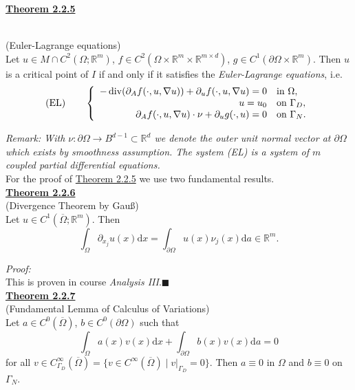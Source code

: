 \hypertarget{theorem_2_2_5}{\textbf{\underline{Theorem 2.2.5}}}\\
(Euler-Lagrange equations)\\
Let $u\in M\cap C^2(\Omega;\mathbb{R}^m)$, $f\in C^2(\Omega\times\mathbb{R}^m\times\mathbb{R}^{m\times d})$, $g\in C^1(\partial\Omega\times\mathbb{R}^m)$. Then $u$ is a critical point of $I$ if and only if it satisfies the \textit{Euler-Lagrange equations}, i.e.
\[\text{(EL)}\qquad\left\{\begin{array}{rl}
	-\operatorname{div}\mathopen{}\left(\partial_Af(\cdot,u,\nabla u)\right)\mathclose{}+\partial_uf(\cdot,u,\nabla u)=0&\text{in }\Omega,\\
	u=u_0&\text{on }\Gamma_D,\\
	\partial_Af(\cdot,u,\nabla u)\cdot\nu+\partial_ug(\cdot,u)=0&\text{on }\Gamma_N.
\end{array}\right.\]

\textit{Remark: With $\nu:\partial\Omega\longrightarrow B^{d-1}\subset\mathbb{R}^d$ we denote the outer unit normal vector at $\partial\Omega$ which exists by smoothness assumption. The system (EL) is a system of $m$ coupled partial differential equations.}\\

For the proof of \hyperlink{theorem_2_2_5}{Theorem 2.2.5} we use two fundamental results.\\

\hypertarget{theorem_2_2_6}{\textbf{\underline{Theorem 2.2.6}}}\\
(Divergence Theorem by Gau{\ss})\\
Let $u\in C^1(\overline{\Omega};\mathbb{R}^m)$. Then
\[\int_\Omega{\partial_{x_j}u(x)\mathrm{d}x}=\int_{\partial \Omega}{u(x)\nu_j(x)\mathrm{d}a}\in\mathbb{R}^m.\]

\textit{Proof:}\\
This is proven in course \textit{Analysis III}.\hfill$\blacksquare$\\[11pt]

\hypertarget{theorem_2_2_7}{\textbf{\underline{Theorem 2.2.7}}}\\
(Fundamental Lemma of Calculus of Variations)\\
Let $a\in C^0(\overline{\Omega})$, $b\in C^0(\partial\Omega)$ such that
\[\int_\Omega{a(x)v(x)\mathrm{d}x}+\int_{\partial\Omega}{b(x)v(x)\mathrm{d}a}=0\]
for all $v\in C_{\Gamma_D}^\infty(\overline{\Omega})=\{v\in C^\infty(\overline{\Omega})\mid v|_{\Gamma_D}=0\}$. Then $a\equiv0$ in $\Omega$ and $b\equiv0$ on $\Gamma_N$.\\

